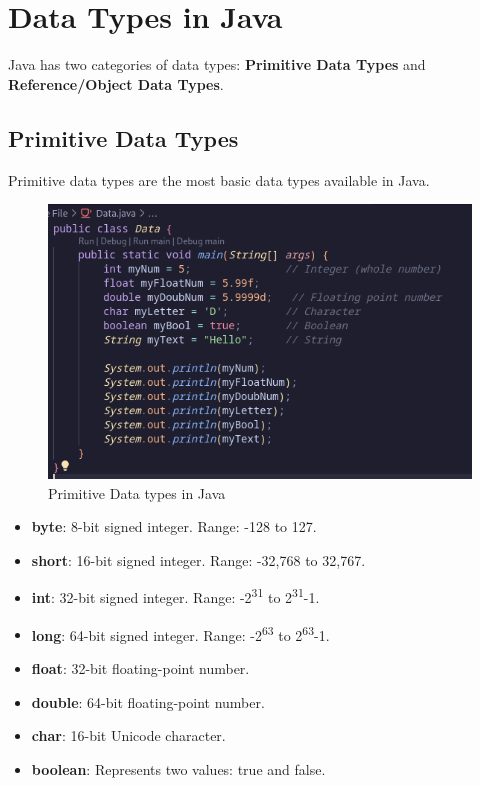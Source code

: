 \documentclass[a4paper,12pt]{article}
\begin{document}
\section{Data Types in Java}
Java has two categories of data types: \textbf{Primitive Data Types} and \textbf{Reference/Object Data Types}.

\subsection{Primitive Data Types}
Primitive data types are the most basic data types available in Java.
\begin{figure}[H]
    \centering
    \includegraphics[width=0.9\linewidth]{images/DataType.png}
    \caption{Primitive Data types in Java}
    \label{fig:sample_image}
\end{figure}

\begin{itemize}[leftmargin=2cm]
    \item \textbf{byte}: 8-bit signed integer. Range: -128 to 127.
    \item \textbf{short}: 16-bit signed integer. Range: -32,768 to 32,767.
    \item \textbf{int}: 32-bit signed integer. Range: -2\textsuperscript{31} to 2\textsuperscript{31}-1.
    \item \textbf{long}: 64-bit signed integer. Range: -2\textsuperscript{63} to 2\textsuperscript{63}-1.
    \item \textbf{float}: 32-bit floating-point number.
    \item \textbf{double}: 64-bit floating-point number.
    \item \textbf{char}: 16-bit Unicode character.
    \item \textbf{boolean}: Represents two values: true and false.
\end{itemize}
\end{document}
